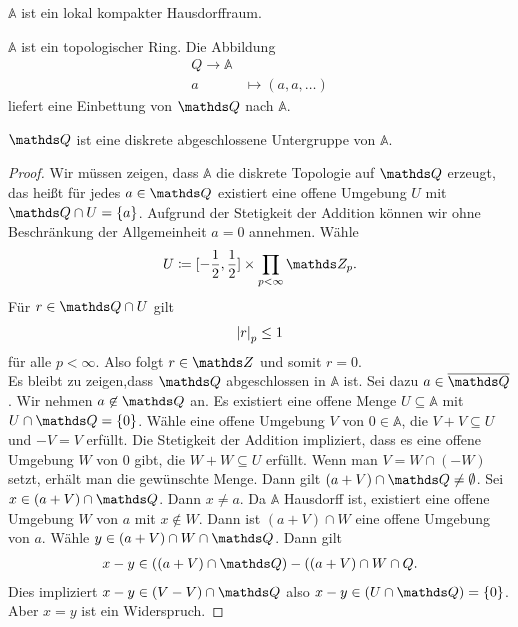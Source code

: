 \begin{bem}
$\mathbb{A}$ ist ein lokal kompakter Hausdorffraum.
\end{bem}

\begin{prop}
$\mathbb{A}$ ist ein topologischer Ring.
Die Abbildung
\begin{align*}
Q \to \mathbb{A}\\
a &\mapsto (a,a,\dots)
\end{align*}
liefert eine Einbettung von $\Q$ nach $\mathbb{A}$.
\end{prop}

\begin{prop}
$\Q$ ist eine diskrete abgeschlossene Untergruppe von $\mathbb{A}$.
\end{prop}
\begin{proof}
Wir müssen zeigen, dass $\mathbb{A}$ die diskrete Topologie auf $\Q$ erzeugt, das heißt für jedes $a\in \Q$ existiert eine offene Umgebung $U$ mit $\Q \cap U=\{a\}$.
Aufgrund der Stetigkeit der Addition können wir ohne Beschränkung der Allgemeinheit $a=0$ annehmen.
Wähle
\begin{align*}
U\coloneqq [-\frac{1}{2},\frac{1}{2}] \times \prod_{p <\infty} \Z_p.
\end{align*}
Für $r \in \Q \cap U$ gilt
\begin{align*}
\left\vert r\right\vert_p \leq 1
\end{align*}
für alle $p<\infty$.
Also folgt $r\in \Z$ und somit $r=0$.\\
Es bleibt zu zeigen,dass $\Q$ abgeschlossen in $\mathbb{A}$ ist.
Sei dazu $a\in \overline{\Q}$. Wir nehmen $a \not \in \Q$ an.
Es existiert eine offene Menge $U \subseteq \mathbb{A}$ mit $U \cap \Q=\{0\}$.
Wähle eine offene Umgebung $V$ von $0\in \mathbb{A}$, die $V+V \subseteq U$ und $-V=V$ erfüllt.
Die Stetigkeit der Addition impliziert, dass es eine offene Umgebung $W$ von $0$ gibt, die $W+W\subseteq U$ erfüllt. Wenn man $V=W \cap (-W)$ setzt, erhält man die gewünschte Menge.
Dann gilt $(a+V)\cap \Q\not=\emptyset$.
Sei $x\in (a+V)\cap \Q$. Dann $x\not =a$.
Da $\mathbb{A}$ Hausdorff ist, existiert eine offene Umgebung $W$ von $a$ mit $x\not \in W$.
Dann ist $(a+V)\cap W$ eine offene Umgebung von $a$.
Wähle $y \in (a+V)\cap W \cap \Q$.
Dann gilt
\begin{align*}
x-y\in ((a+V)\cap \Q)-((a+V)\cap W \cap Q.
\end{align*}
Dies impliziert $x-y \in  (V-V)\cap \Q$ also $x-y\in (U\cap \Q)=\{0\}$.
Aber $x=y$ ist ein Widerspruch.
\end{proof}

